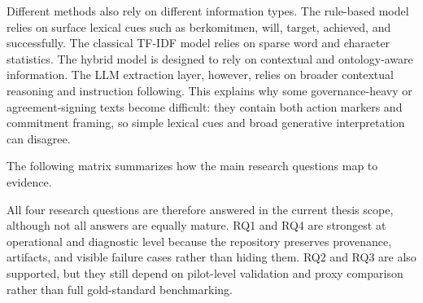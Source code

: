 \documentclass[english, online, cse, master]{dithesis}
\begin{document}
Different methods also rely on different information types. The rule-based model relies on surface lexical cues such as berkomitmen, will, target, achieved, and successfully. The classical TF-IDF model relies on sparse word and character statistics. The hybrid model is designed to rely on contextual and ontology-aware information. The LLM extraction layer, however, relies on broader contextual reasoning and instruction following. This explains why some governance-heavy or agreement-signing texts become difficult: they contain both action markers and commitment framing, so simple lexical cues and broad generative interpretation can disagree.

The following matrix summarizes how the main research questions map to evidence.

All four research questions are therefore answered in the current thesis scope, although not all answers are equally mature. RQ1 and RQ4 are strongest at operational and diagnostic level because the repository preserves provenance, artifacts, and visible failure cases rather than hiding them. RQ2 and RQ3 are also supported, but they still depend on pilot-level validation and proxy comparison rather than full gold-standard benchmarking.
\end{document}

